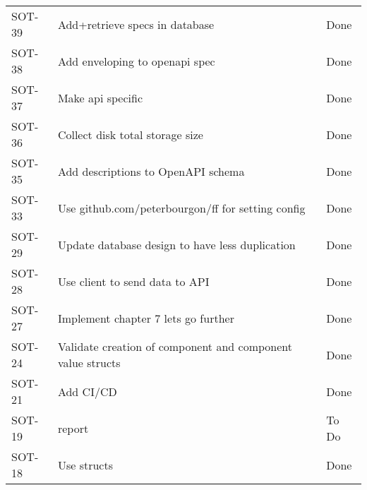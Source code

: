 \documentclass[dutch]{article}
\begin{document}
\begin{longtable}{@{}lp{6cm}l@{}}
    SOT-39             & Add+retrieve specs in database                                                                                            & Done            \\
    SOT-38             & Add enveloping to openapi spec                                                                                            & Done            \\
    SOT-37             & Make api specific                                                                                                         & Done            \\
    SOT-36             & Collect disk total storage size                                                                                           & Done            \\
    SOT-35             & Add descriptions to OpenAPI schema                                                                                        & Done            \\
    SOT-33             & Use github.com/peterbourgon/ff for setting config                                                                         & Done            \\
    SOT-29             & Update database design to have less duplication                                                                           & Done            \\
    SOT-28             & Use client to send data to API                                                                                            & Done            \\
    SOT-27             & Implement chapter 7 lets go further                                                                                       & Done            \\
    SOT-24             & Validate creation of component and component value structs                                                                & Done            \\
    SOT-21             & Add CI/CD                                                                                                                 & Done            \\
    SOT-19             & report                                                                                                                    & To Do           \\
    SOT-18             & Use structs                                                                                                               & Done            \\

\end{longtable}
\end{document}
